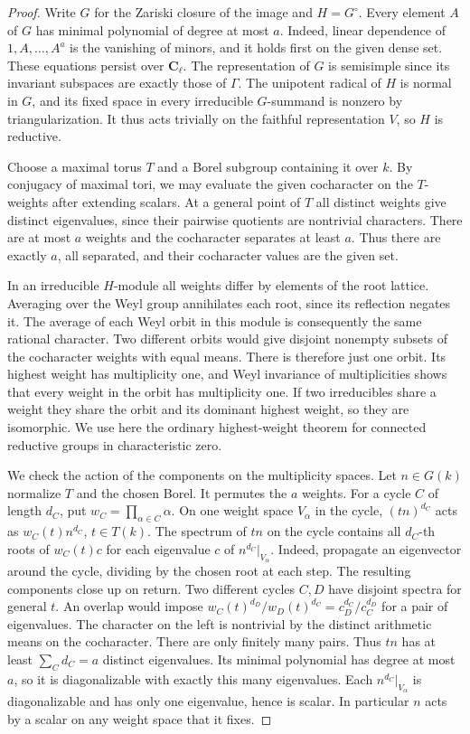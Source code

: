 \begin{proof}
Write \(G\) for the Zariski closure of the image and \(H=G^\circ\).
Every element \(A\) of \(G\) has minimal polynomial of degree at most
\(a\). Indeed, linear dependence of \(1,A,\ldots,A^a\) is the
vanishing of minors, and it holds first on the given dense set.
These equations persist over \(\mathbf C_\ell\). The representation of
\(G\) is semisimple since its invariant subspaces are exactly those of
\(\Gamma\). The unipotent radical of \(H\) is normal in \(G\), and its
fixed space in every irreducible \(G\)-summand is nonzero by triangularization.
It thus acts trivially on the faithful representation \(V\), so \(H\)
is reductive.

Choose a maximal torus \(T\) and a Borel subgroup containing it over \(k\).
By conjugacy of maximal tori, we may evaluate the given cocharacter on
the \(T\)-weights after extending scalars. At a general point of \(T\)
all distinct weights give distinct eigenvalues, since their pairwise
quotients are nontrivial characters. There are at most \(a\) weights
and the cocharacter separates at least \(a\). Thus there are exactly
\(a\), all separated, and their cocharacter values are the given set.

In an irreducible \(H\)-module all weights differ by elements of the
root lattice. Averaging over the Weyl group annihilates each root,
since its reflection negates it. The average of each Weyl orbit in
this module is consequently the same rational character. Two different
orbits would give disjoint nonempty subsets of the cocharacter weights
with equal means. There is therefore just one orbit. Its highest weight
has multiplicity one, and Weyl invariance of multiplicities shows that
every weight in the orbit has multiplicity one. If two irreducibles
share a weight they share the orbit and its dominant highest weight,
so they are isomorphic. We use here the ordinary highest-weight theorem
for connected reductive groups in characteristic zero.

We check the action of the components on the multiplicity spaces.
Let \(n\in G(k)\) normalize \(T\) and the chosen Borel. It permutes
the \(a\) weights. For a cycle \(C\) of length \(d_C\), put
\(w_C=\prod_{\alpha\in C}\alpha\). On one weight space \(V_\alpha\)
in the cycle, \((tn)^{d_C}\) acts as \(w_C(t)n^{d_C}\), \(t\in T(k)\).
The spectrum of \(tn\) on the cycle contains all \(d_C\)-th roots of
\(w_C(t)c\) for each eigenvalue \(c\) of \(n^{d_C}|_{V_\alpha}\).
Indeed, propagate an eigenvector around the cycle, dividing by the
chosen root at each step. The resulting components close up on return.
Two different cycles \(C,D\) have disjoint spectra for general \(t\).
An overlap would impose
\(w_C(t)^{d_D}/w_D(t)^{d_C}=c_D^{d_C}/c_C^{d_D}\) for a pair of eigenvalues.
The character on the left is nontrivial by the distinct arithmetic
means on the cocharacter. There are only finitely many pairs.
Thus \(tn\) has at least \(\sum_C d_C=a\) distinct eigenvalues.
Its minimal polynomial has degree at most \(a\), so it is diagonalizable
with exactly this many eigenvalues. Each \(n^{d_C}|_{V_\alpha}\)
is diagonalizable and has only one eigenvalue, hence is scalar.
In particular \(n\) acts by a scalar on any weight space that it fixes.


\end{proof}
